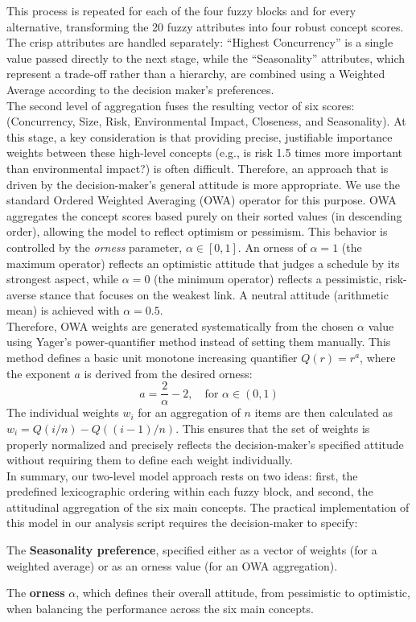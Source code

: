 This process is repeated for each of the four fuzzy blocks and for every alternative, transforming the 20 fuzzy attributes into four robust concept scores. The crisp attributes are handled separately: ``Highest Concurrency'' is a single value passed directly to the next stage, while the ``Seasonality'' attributes, which represent a trade-off rather than a hierarchy, are combined using a Weighted Average according to the decision maker's preferences.\\

The second level of aggregation fuses the resulting vector of six scores: (Concurrency, Size, Risk, Environmental Impact, Closeness, and Seasonality). At this stage, a key consideration is that providing precise, justifiable importance weights between these high-level concepts (e.g., is risk 1.5 times more important than environmental impact?) is often difficult. Therefore, an approach that is driven by the decision-maker's general attitude is more appropriate. We use the standard Ordered Weighted Averaging (OWA) operator for this purpose. OWA aggregates the concept scores based purely on their sorted values (in descending order), allowing the model to reflect optimism or pessimism. This behavior is controlled by the \textit{orness} parameter, $\alpha \in [0, 1]$. An orness of $\alpha=1$ (the maximum operator) reflects an optimistic attitude that judges a schedule by its strongest aspect, while $\alpha=0$ (the minimum operator) reflects a pessimistic, risk-averse stance that focuses on the weakest link. A neutral attitude (arithmetic mean) is achieved with $\alpha=0.5$.\\

Therefore, OWA weights are generated systematically from the chosen $\alpha$ value using Yager's power-quantifier method instead of setting them manually. This method defines a basic unit monotone increasing quantifier $Q(r) = r^a$, where the exponent $a$ is derived from the desired orness:
\begin{equation}
a = \frac{2}{\alpha} - 2, \quad \text{for } \alpha \in (0, 1)
\end{equation}
The individual weights $w_i$ for an aggregation of $n$ items are then calculated as $w_i = Q(i/n) - Q((i-1)/n)$. This ensures that the set of weights is properly normalized and precisely reflects the decision-maker's specified attitude without requiring them to define each weight individually.\\

In summary, our two-level model approach rests on two ideas: first, the predefined lexicographic ordering within each fuzzy block, and second, the attitudinal aggregation of the six main concepts. The practical implementation of this model in our analysis script requires the decision-maker to specify:
\begin{romanenum}
    \item The \textbf{Seasonality preference}, specified either as a vector of weights (for a weighted average) or as an orness value (for an OWA aggregation).
    \item The \textbf{orness} $\alpha$, which defines their overall attitude, from pessimistic to optimistic, when balancing the performance across the six main concepts.
\end{romanenum}